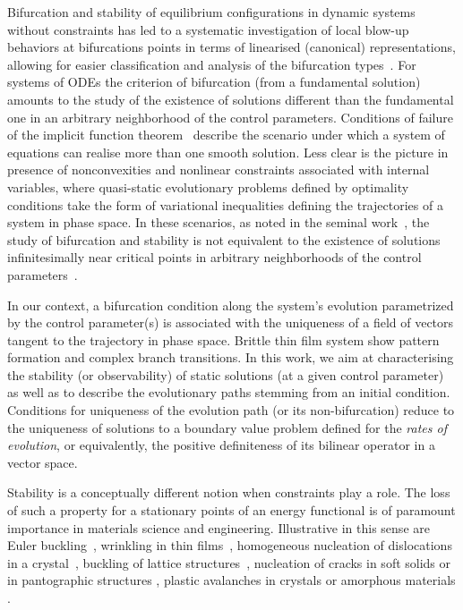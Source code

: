 \documentclass[10pt]{article}
\begin{document}
Bifurcation and stability of equilibrium configurations in dynamic systems without constraints has led to a systematic investigation of local blow-up behaviors at bifurcations points in terms of linearised (canonical) representations, allowing for easier classification and analysis of the bifurcation types~\cite{Iooss2012-el}. 
For systems of ODEs the criterion  of bifurcation (from a fundamental solution) amounts to the study of the existence of solutions different than the fundamental one in an arbitrary neighborhood of the control parameters. Conditions of failure of the implicit function theorem~\cite{Iooss2012-el} describe the scenario under which a system of equations can realise more than one smooth solution.
Less clear is the picture in presence of nonconvexities and nonlinear constraints associated with internal variables, where quasi-static evolutionary problems defined by optimality conditions take the form of variational inequalities defining the trajectories of a system in phase space. In these scenarios, as noted in the seminal work~\cite{Hill1958-xd}, the study of bifurcation and stability is not equivalent to the existence of solutions infinitesimally near critical points in arbitrary neighborhoods of the control parameters~\cite{Bazant2010-zb}.

In our context, a bifurcation condition along the system's evolution parametrized by the control parameter(s) is associated with  the uniqueness of a field of vectors tangent to the trajectory in phase space.
%
%
%
Brittle thin film system show pattern formation and complex branch transitions. In this work, we aim at characterising the stability (or observability) of static solutions (at a given control parameter) as well as to describe the evolutionary paths stemming from an initial condition. Conditions for uniqueness of the evolution path (or its non-bifurcation) reduce to the uniqueness of solutions to a boundary value problem defined for the \emph{rates of evolution}, or equivalently, the positive definiteness of its bilinear operator in a vector space.

Stability is a conceptually different notion when constraints play a role.
The loss of such a property for a stationary points of an energy functional is of paramount importance in materials science and engineering. Illustrative in this sense are Euler buckling~\cite{Bettiol2020-ey}, wrinkling in thin films~\cite{Hutchinson2013-jk}, homogeneous nucleation of dislocations in a crystal~\cite{Carpio2005-bv,Plans2007-cx,Baggio2019-rs,Mayer2022-km,Baggio2023-qu}, buckling of lattice structures~\cite{Combescure2016-dy,Bertoldi2008-au}, nucleation of cracks in soft solids or in pantographic structures \cite{Riccobelli2023-fc,Salman2021-mn}, plastic  avalanches in crystals or amorphous materials \cite{Zhang2020-ax,Weiss2021-db,Yang2020-zm}.
\end{document}
